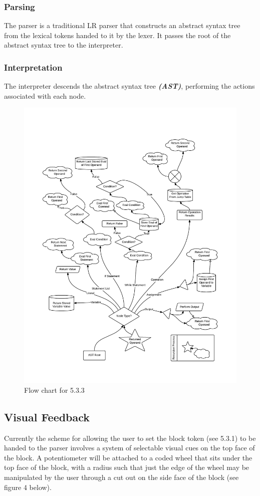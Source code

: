     \subsubsection{Parsing}
      The parser is a traditional LR parser that constructs an abstract syntax tree from the lexical tokens handed to it by the lexer. It passes the root of the abstract syntax tree to the interpreter.
    \subsubsection{Interpretation}
      The interpreter descends the abstract syntax tree \textit{\textbf{(AST)}}, performing the actions associated with each node.
 \begin{figure}[H]
   \centering
 \includegraphics[width=6in]{central_processor_interpreter}
    \caption{Flow chart for 5.3.3}
   \end{figure}
\subsection{ Visual Feedback}
Currently the scheme for allowing the user to set the  block token (see 5.3.1) to be handed to the parser involves a system of selectable visual cues on the top face of the block. A potentiometer will be attached to a coded wheel that sits under the top face of the block, with a radius such that just the edge of the wheel may be manipulated by the user through a cut out on the side face of the block (see figure 4 below).


